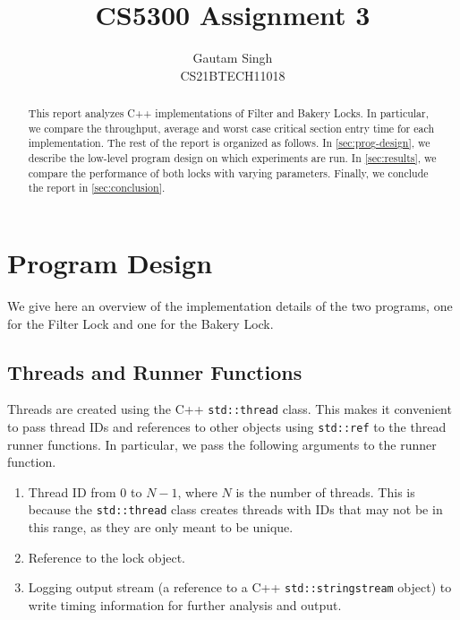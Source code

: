 \documentclass[conference,compsoc]{IEEEtran}
\begin{document}
\vspace{3cm}
\title{CS5300 Assignment 3}
\author{Gautam Singh\\CS21BTECH11018}
\maketitle
\tableofcontents

\bigskip

\begin{abstract}
    This report analyzes C++ implementations of Filter and Bakery Locks. In
    particular, we compare the throughput, average and worst case critical
    section entry time for each implementation. The rest of the report is
    organized as follows. In \autoref{sec:prog-design}, we describe the
    low-level program design on which experiments are run. In
    \autoref{sec:results}, we compare the performance of both locks with varying
    parameters. Finally, we conclude the report in \autoref{sec:conclusion}.
\end{abstract}

\section{Program Design}
\label{sec:prog-design}

We give here an overview of the implementation details of the two programs, one
for the Filter Lock and one for the Bakery Lock.

\subsection{Threads and Runner Functions}
\label{subsec:threads-and-runners}
Threads are created using the C++ \texttt{std::thread} class. This makes it
convenient to pass thread IDs and references to other objects using
\texttt{std::ref} to the thread runner functions. In particular, we pass the
following arguments to the runner function.

\begin{enumerate}
    \item Thread ID from 0 to \(N - 1\), where \(N\) is the number of threads.
    This is because the \texttt{std::thread} class creates threads with IDs that
    may not be in this range, as they are only meant to be unique.
    \item Reference to the lock object.
    \item Logging output stream (a reference to a C++ \texttt{std::stringstream}
    object) to write timing information for further analysis and output.
\end{enumerate}
\end{document}
